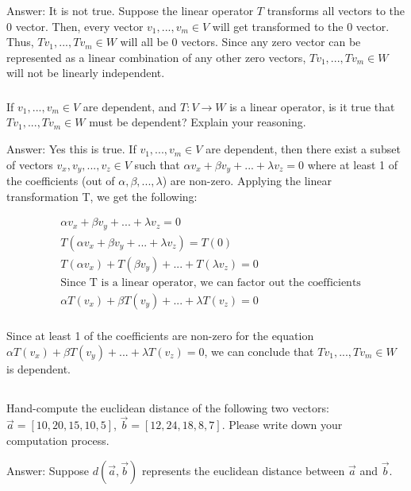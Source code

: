\documentclass[12pt]{article}
\begin{document}
\color{blue}
Answer: It is not true. Suppose the linear operator $T$ transforms all vectors to the 0 vector. Then, every vector $v_1, ..., v_m \in V$ will get transformed to the 0 vector. Thus, $Tv_1, ..., Tv_m \in W$ will all be 0 vectors. Since any zero vector can be represented as a linear combination of any other zero vectors, $Tv_1, ..., Tv_m \in W$ will not be linearly independent.

\color{black}
\subsubsection{}
If $v_1, ..., v_m \in V$ are dependent, and $T : V \rightarrow W$ is a linear operator, is it true that $Tv_1, ..., Tv_m \in W$ must be dependent? Explain your reasoning.

\color{blue}
Answer: Yes this is true. If $v_1, ..., v_m \in V$ are dependent, then there exist a subset of vectors $v_x, v_y, ..., v_z \in V$ such that $\alpha v_x + \beta v_y + ... + \lambda v_z = 0$ where at least 1 of the coefficients (out of $\alpha, \beta, ..., \lambda$) are non-zero. Applying the linear transformation T, we get the following:

\begin{align*}
&\alpha v_x + \beta v_y + ... + \lambda v_z = 0 \\
&T(\alpha v_x + \beta v_y + ... + \lambda v_z) = T(0) \\
&T(\alpha v_x) + T(\beta v_y) + ... + T(\lambda v_z) = 0 \\
&\text {Since T is a linear operator, we can factor out the coefficients} \\
&\alpha T(v_x) + \beta T(v_y) + ... + \lambda T(v_z) = 0 \\
\end{align*}

Since at least 1 of the coefficients are non-zero for the equation $\alpha T(v_x) + \beta T(v_y) + ... + \lambda T(v_z) = 0$, we can conclude that $Tv_1, ..., Tv_m \in W$ is dependent.

\color{black}
\subsection{}
Hand-compute the euclidean distance of the following two vectors: $\vec{a} = [10,20,15,10,5]$, $\vec{b} = [12,24,18,8,7]$. Please write down your computation process.

\color{blue}
Answer: Suppose $d(\vec{a}, \vec{b})$ represents the euclidean distance between $\vec{a}$ and $\vec{b}$.
\end{document}
